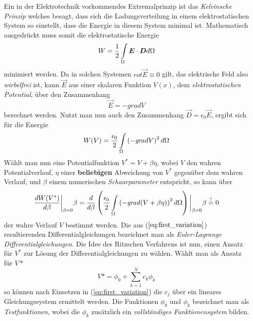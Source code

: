Ein in der Elektrotechnik vorkommendes Extremalprinzip ist das \textit{Kelvinsche Prinzip} welches besagt, dass sich die Ladungsverteilung in einem elektrostatischen System so einstellt, dass die Energie in diesem System minimal ist.\newline
Mathematisch ausgedrückt muss somit die elektrostatische Energie 
\begin{equation}
W = \frac{1}{2} \int\displaylimits_{\Omega} \vec{E}\cdot\vec{D} d\Omega
\end{equation}
minimiert werden. \newline
Da in solchen Systemen $\mathit{rot}\vec{E} \equiv 0$ gilt, das elektrische Feld also \textit{wirbelfrei} ist, kann $\vec{E}$ aus einer skalaren Funktion $V(x)$, dem \textit{elektrostatischen Potential}, über den Zusammenhang 
\begin{equation}
\label{eq:e_grad_V}
\vec{E} = -\mathit{grad}V
\end{equation}
berechnet werden. Nutzt man nun auch den Zusammenhang $\vec{D} = \epsilon_0 \vec{E}$, ergibt sich für die Energie
\begin{equation} 
\label{eq:functional}
W(V)= \frac{\epsilon_0}{2} \int\displaylimits_{\Omega} \left(-\mathit{grad}V\right)^2 d\Omega
\end{equation}
 Wählt man nun eine Potentialfunktion $V^* = V + \beta \eta$, wobei $V$ den wahren Potentialverlauf, $\eta$ einer \textbf{beliebigen} Abweichung von $V^*$ gegenüber dem wahren Verlauf, und $\beta$ einem numerischen \textit{Schaarparameter} entspricht, so kann über 
 \begin{equation}
 \label{eq:first_variation}
 \frac{dW(V^*)}{d\beta}\bigg\vert_{\beta = 0} \beta = \frac{d}{d\beta} \left(\frac{\epsilon_0}{2} \int\displaylimits_{\Omega} \left(- \mathit{grad}(V + \beta \eta)\right)^2 d\Omega \right)\bigg\vert_{\beta = 0} \beta \overset{!}{=} 0
 \end{equation} 
 der wahre Verlauf $V$ bestimmt werden.\newline
 Die aus ($\ref{eq:first_variation}$) resultierenden Differentialgleichungen bezeichnet man als \textit{Euler-Lagrange Differentialgleichungen}. Die Idee des Ritzschen Verfahrens ist nun, einen Ansatz für $V^*$ zur Lösung der Differentialgleichungen zu wählen. \newline
 Wählt man als Ansatz für $V*$
 \begin{equation}
 V* = \phi_0 + \sum_{k = 1}^{N} c_k \phi_k
 \end{equation}
 so können nach Einsetzen in (\ref{eq:first_variation}) die $c_j$ über ein lineares Gleichungssystem ermittelt werden. Die Funktionen $\phi_0$ und $\phi_k$ bezeichnet man als \textit{Testfunktionen}, wobei die $\phi_k$ zusätzlich ein \textit{vollständiges Funktionensystem} bilden.\newline
 
